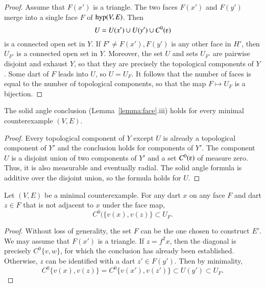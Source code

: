 \begin{proof}
Assume that $F(x')$ is a triangle.
The two faces $F(x')$ and $F(y')$ merge into a single face $F$ of ${\operatorname{hyp}}(V,E)$.
Then 
\begin{equation}\label{eqn:U}
U= U(x')\cup U(y')\cup C^0(\e)
\end{equation} 
is a connected open set in $Y$.
If $F'\ne F(x'),F(y')$ is any other face in $H'$, then $U_{F'}$ is
a connected open set in $Y$.  Moreover, the set $U$ and sets $U_{F'}$
are pairwise disjoint and exhaust $Y$, so that they are precisely the topological
components of $Y$.  Some dart of $F$ leads into $U$, so $U=U_F$.  It follows
that the number of faces is equal to the number of topological components, so that the map $F\mapsto U_F$ is a bijection.
\end{proof}


\begin{lemma}  The solid angle conclusion (Lemma~\ref{lemma:face}.iii) holds for every minimal counterexample $(V,E)$.
\end{lemma}

\begin{proof} Every topological component of $Y$ 
except $U$ is already a topological component of $Y'$ and the conclusion
holds for components of $Y'$.  The component $U$ is a disjoint union of two
components of $Y'$ and a set $C^0(\e)$ of measure zero.  Thus, it
is also measurable and eventually radial.  The solid angle formula is
additive over the disjoint union, so the formula holds for $U$.
\end{proof}


\begin{lemma}  Let $(V,E)$ be a minimal counterexample.  For any dart $x$ on any face $F$ and dart $z\in F$ that is not adjacent to $x$ under the face map, 
$$
C^0(\{v(x),v(z)\} \subset U_F.
$$
\end{lemma}

\begin{proof}  Without loss of generality, the set $F$ can be the one chosen to construct $E'$.
We may assume that $F(x')$ is a triangle.
If $z=f^2x$, then the diagonal is precisely $C^0\{v,w\}$,
for which the conclusion has already been established.  Otherwise, $z$ can be identified with
a dart $z'\in F(y')$.  Then by minimality,
$$
C^0\{v(x),v(z)\} = C^0\{v(x'),v(z')\} \subset U(y') \subset U_F.
$$
\end{proof}

